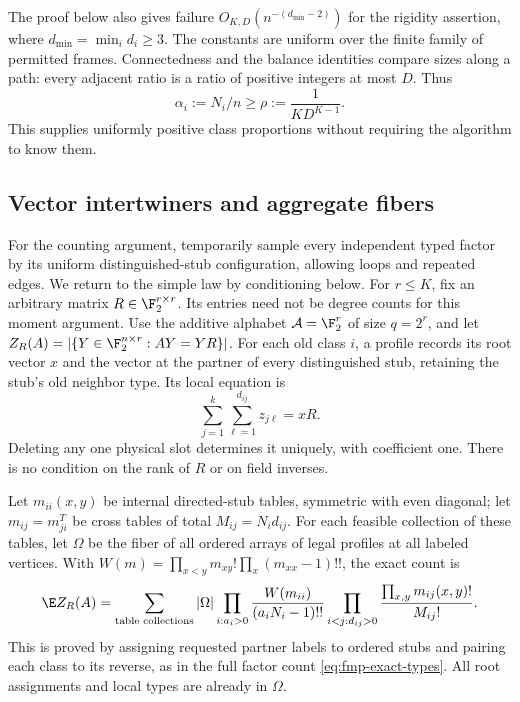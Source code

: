 The proof below also gives failure $O_{K,D}(n^{-(d_{\min}-2)})$
for the rigidity assertion, where $d_{\min}=\min_i d_i\ge3$.
The constants are uniform over the finite family of permitted frames.
Connectedness and the balance identities compare sizes along a path:
every adjacent ratio is a ratio of positive integers at most $D$.
Thus
\begin{equation}\label{eq:unknown-rho}
 \alpha_i:=N_i/n\ge\rho:=\frac1{KD^{K-1}}.
\end{equation}
This supplies uniformly positive class proportions without requiring
the algorithm to know them.

\subsection{Vector intertwiners and aggregate fibers}
For the counting argument, temporarily sample every independent typed
factor by its uniform distinguished-stub configuration, allowing loops
and repeated edges. We return to the simple law by conditioning below.
For $r\le K$, fix an arbitrary matrix $R\in\F_2^{r\times r}$.
Its entries need not be degree counts for this moment argument.
Use the additive alphabet $\mathcal A=\F_2^r$ of size $q=2^r$,
and let
$Z_R(A)=|\{Y\in\F_2^{n\times r}:AY=YR\}|$.
For each old class $i$, a profile records its root vector $x$ and
the vector at the partner of every distinguished stub, retaining
the stub's old neighbor type. Its local equation is
\begin{equation}\label{eq:unknown-star}
 \sum_{j=1}^k\sum_{\ell=1}^{d_{ij}}z_{j\ell}=xR.
\end{equation}
Deleting any one physical slot determines it uniquely, with coefficient
one. There is no condition on the rank of $R$ or on field inverses.

Let $m_{ii}(x,y)$ be internal directed-stub tables, symmetric with
even diagonal; let $m_{ij}=m_{ji}^T$ be cross tables of total
$M_{ij}=N_id_{ij}$. For each feasible collection of these tables,
let $\Omega$ be the fiber of all ordered arrays of legal profiles
at all labeled vertices. With
$W(m)=\prod_{x<y}m_{xy}!\prod_x(m_{xx}-1)!!$, the exact count is
\begin{equation}\label{eq:unknown-fiber}
 \E Z_R(A)=\sum_{\text{table collections}}|\Omega|
  \prod_{i:a_i>0}\frac{W(m_{ii})}{(a_iN_i-1)!!}
  \prod_{i<j:d_{ij}>0}\frac{\prod_{x,y}m_{ij}(x,y)!}{M_{ij}!}.
\end{equation}
This is proved by assigning requested partner labels to ordered stubs
and pairing each class to its reverse, as in the full factor count
\eqref{eq:fmp-exact-types}. All root assignments and local types are
already in $\Omega$.

